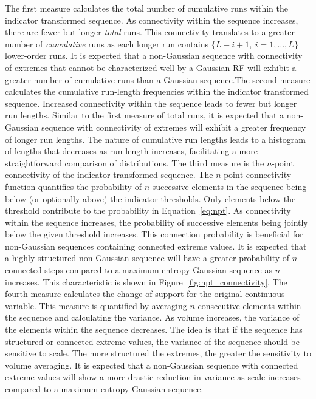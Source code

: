 The first measure calculates the total number of cumulative runs within the indicator transformed sequence. As connectivity within the sequence increases, there are fewer but longer \emph{total} runs. This connectivity translates to a greater number of \emph{cumulative} runs as each longer run contains $\{L-i+1, \ i=1,\dots,L\}$ lower-order runs. It is expected that a non-Gaussian sequence with connectivity of extremes that cannot be characterized well by a Gaussian RF will exhibit a greater number of cumulative runs than a Gaussian sequence.The second measure calculates the cumulative run-length frequencies within the indicator transformed sequence. Increased connectivity within the sequence leads to fewer but longer run lengths. Similar to the first measure of total runs, it is expected that a non-Gaussian sequence with connectivity of extremes will exhibit a greater frequency of longer run lengths. The nature of cumulative run lengths leads to a histogram of lengths that decreases as run-length increases, facilitating a more straightforward comparison of distributions. The third measure is the $n\text{-point}$ connectivity of the indicator transformed sequence. The $n\text{-point}$ connectivity function quantifies the probability of $n$ successive elements in the sequence being below (or optionally above) the indicator thresholds. Only elements below the threshold contribute to the probability in Equation~\ref{eq:npt}. As connectivity within the sequence increases, the probability of successive elements being jointly below the given threshold increases. This connection probability is beneficial for non-Gaussian sequences containing connected extreme values. It is expected that a highly structured non-Gaussian sequence will have a greater probability of $n$ connected steps compared to a maximum entropy Gaussian sequence as $n$ increases. This characteristic is shown in Figure~\ref{fig:npt_connectivity}. The fourth measure calculates the change of support for the original continuous variable. This measure is quantified by averaging $n$ consecutive elements within the sequence and calculating the variance. As volume increases, the variance of the elements within the sequence decreases. The idea is that if the sequence has structured or connected extreme values, the variance of the sequence should be sensitive to scale. The more structured the extremes, the greater the sensitivity to volume averaging. It is expected that a non-Gaussian sequence with connected extreme values will show a more drastic reduction in variance as scale increases compared to a maximum entropy Gaussian sequence.

